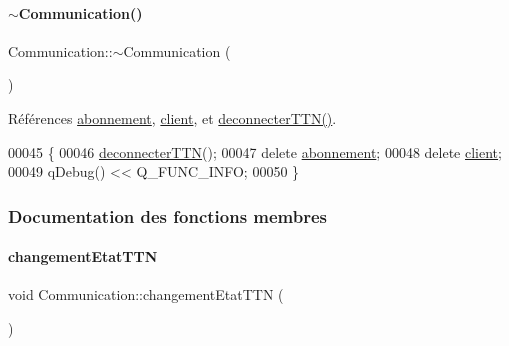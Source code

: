 \mbox{\label{class_communication_a75ba08ce908d45251e28e4c1db94e6f4}} 
\paragraph{\texorpdfstring{$\sim$\+Communication()}{~Communication()}}
{\footnotesize\ttfamily Communication\+::$\sim$\+Communication (\begin{DoxyParamCaption}{ }\end{DoxyParamCaption})}



Références \hyperlink{class_communication_af29011664fbb15b9fb41ce37b70a694f}{abonnement}, \hyperlink{class_communication_a59ae01a54d6c3fde6242c46d802b954b}{client}, et \hyperlink{class_communication_a8d0cc5c992a2b218a64f57429eea001b}{deconnecter\+T\+T\+N()}.


\begin{DoxyCode}
00045 \{
00046     \hyperlink{class_communication_a8d0cc5c992a2b218a64f57429eea001b}{deconnecterTTN}();
00047     \textcolor{keyword}{delete} \hyperlink{class_communication_af29011664fbb15b9fb41ce37b70a694f}{abonnement};
00048     \textcolor{keyword}{delete} \hyperlink{class_communication_a59ae01a54d6c3fde6242c46d802b954b}{client};
00049     qDebug() << Q\_FUNC\_INFO;
00050 \}
\end{DoxyCode}


\subsubsection{Documentation des fonctions membres}
\mbox{\label{class_communication_af249c498d61b4288b9e7d388baf81fc2}} 
\paragraph{\texorpdfstring{changement\+Etat\+T\+TN}{changementEtatTTN}}
{\footnotesize\ttfamily void Communication\+::changement\+Etat\+T\+TN (\begin{DoxyParamCaption}{ }\end{DoxyParamCaption})\hspace{0.3cm}{\ttfamily [slot]}}




